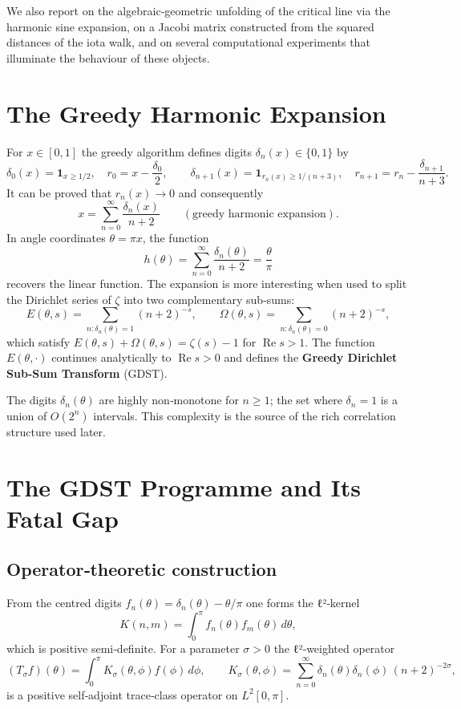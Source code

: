 \documentclass[11pt,a4paper]{article}
\newcommand{\RE}{\operatorname{Re}}
\begin{document}
We also report on the algebraic‑geometric unfolding of the critical line via the harmonic sine expansion, on a Jacobi matrix constructed from the squared distances of the iota walk, and on several computational experiments that illuminate the behaviour of these objects.

\section{The Greedy Harmonic Expansion}
\label{sec:greedy}

For \(x\in[0,1]\) the greedy algorithm defines digits \(\delta_n(x)\in\{0,1\}\) by
\[
\delta_0(x)=\mathbf{1}_{x\ge 1/2},\quad r_0=x-\frac{\delta_0}{2},
\qquad
\delta_{n+1}(x)=\mathbf{1}_{r_n(x)\ge 1/(n+3)},\quad r_{n+1}=r_n-\frac{\delta_{n+1}}{n+3}.
\]
It can be proved that \(r_n(x)\to 0\) and consequently
\[
x = \sum_{n=0}^{\infty}\frac{\delta_n(x)}{n+2}\qquad (\text{greedy harmonic expansion}).
\]
In angle coordinates \(\theta=\pi x\), the function
\[
h(\theta)=\sum_{n=0}^{\infty}\frac{\delta_n(\theta)}{n+2}= \frac{\theta}{\pi}
\]
recovers the linear function.  The expansion is more interesting when used to split the Dirichlet series of \(\zeta\) into two complementary sub‑sums:
\[
E(\theta,s)=\sum_{n:\delta_n(\theta)=1}(n+2)^{-s},\qquad
\Omega(\theta,s)=\sum_{n:\delta_n(\theta)=0}(n+2)^{-s},
\]
which satisfy \(E(\theta,s)+\Omega(\theta,s)=\zeta(s)-1\) for \(\RE s>1\).  The function \(E(\theta,\cdot)\) continues analytically to \(\RE s>0\) and defines the \textbf{Greedy Dirichlet Sub‑Sum Transform} (GDST).

The digits \(\delta_n(\theta)\) are highly non‑monotone for \(n\ge 1\); the set where \(\delta_n=1\) is a union of \(O(2^n)\) intervals.  This complexity is the source of the rich correlation structure used later.

\section{The GDST Programme and Its Fatal Gap}
\label{sec:GDST}

\subsection{Operator‑theoretic construction}
From the centred digits \(f_n(\theta)=\delta_n(\theta)-\theta/\pi\) one forms the ℓ²‑kernel
\[
K(n,m)=\int_0^\pi f_n(\theta)f_m(\theta)\,d\theta,
\]
which is positive semi‑definite.  For a parameter \(\sigma>0\) the ℓ²‑weighted operator
\[
(T_\sigma f)(\theta)=\int_0^\pi K_\sigma(\theta,\phi)f(\phi)\,d\phi,\qquad
K_\sigma(\theta,\phi)=\sum_{n=0}^\infty \delta_n(\theta)\delta_n(\phi)\,(n+2)^{-2\sigma},
\]
is a positive self‑adjoint trace‑class operator on \(L^2[0,\pi]\).
\end{document}
